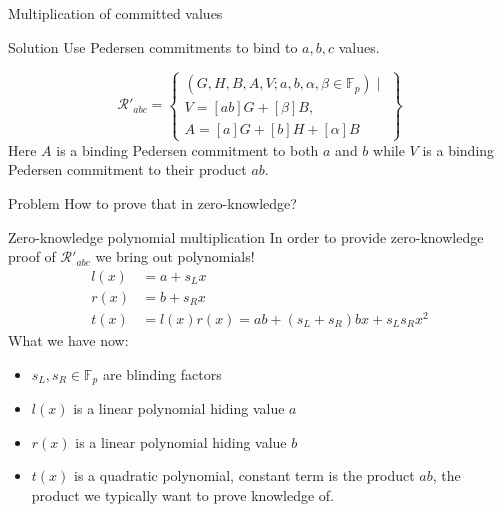\documentclass{zkdl-presentation-template}
\begin{document}
\begin{frame}{Multiplication of committed values}
    \begin{block}{Solution}
        Use Pedersen commitments to bind to $a,b,c$ values.
    \end{block}
    $$
        \mathcal{R}'_{abc} = \left\{\begin{array}{l}
            (G,H,B,A,V; a,b, \alpha, \beta \in \mathbb{F}_p) \mid \\
            V = [ab]G + [\beta]B, \\
            A = [a]G + [b]H + [\alpha]B
        \end{array}\right\}
    $$
    Here $A$ is a binding Pedersen commitment to both $a$ and $b$ while $V$ is a binding Pedersen commitment to their product $ab$.
    \begin{alertblock}{Problem}
        How to prove that in zero-knowledge?
    \end{alertblock}
\end{frame}

\begin{frame}{Zero-knowledge polynomial multiplication}
    In order to provide zero-knowledge proof of $\mathcal{R}'_{abc}$ we bring out polynomials!
    \begin{align*}
        l(x) &= a + s_L x\\
        r(x) &= b + s_R x\\
        t(x) &= l(x)r(x) = ab + (s_L + s_R)bx + s_Ls_Rx^2
    \end{align*}
    What we have now:
    \begin{itemize}
        \item $s_L, s_R \in \mathbb{F}_p$ are blinding factors
        \item $l(x)$ is a linear polynomial hiding value $a$
        \item $r(x)$ is a linear polynomial hiding value $b$
        \item $t(x)$ is a quadratic polynomial, constant term is the product $ab$, the product we typically want to prove knowledge of.
    \end{itemize}
\end{frame}
\end{document}
